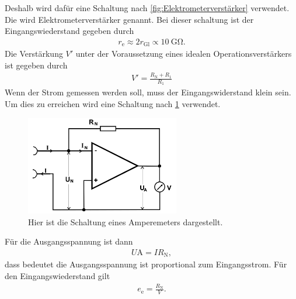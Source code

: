 Deshalb wird dafür eine Schaltung nach \cref{fig:Elektrometerverstärker} verwendet.
Die wird Elektrometerverstärker genannt.
Bei dieser schaltung ist der Eingangswiederstand gegeben durch
\begin{align}
	r_\text{e}\approx 2r_\text{Gl}\propto \SI{10}{\giga\ohm}.
\end{align}
Die Verstärkung $V'$ unter der Voraussetzung eines idealen Operationsverstärkers ist gegeben durch
\begin{align}
	V'=\frac{R_\text{N}+R_1}{R_1 }
\end{align}
Wenn der Strom gemessen werden soll, muss der Eingangswiderstand klein sein.
Um dies zu erreichen wird eine Schaltung nach \cref{fig:Amperemeter} verwendet.
\begin{figure}[h!]
	\centering
	\includegraphics[width = 0.6\textwidth]{../Grafiken/Amperemeter.png}
	\caption{Hier ist die Schaltung eines Amperemeters dargestellt. \cite{V51}\label{fig:Amperemeter}}
\end{figure}
Für die Ausgangsspannung ist dann
\begin{align}
	U\text{A}=IR_\text{N},
\end{align}
dass bedeutet die Ausgangsspannung ist proportional zum Eingangsstrom.
Für den Eingangswiederstand gilt\\
\begin{align*}
	e_\text{e}=\frac{R_\text{N}}{V}.
\end{align*}
